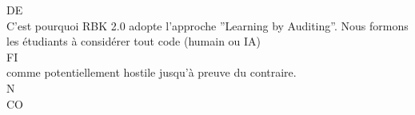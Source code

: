 \documentclass[12pt,landscape,a4paper]{article}
\begin{document}
\vspace{0.5em}
\vspace{0.5em}
\vspace{0.5em}
DE\\
C’est pourquoi RBK 2.0 adopte l’approche ”Learning by Auditing”. Nous formons les étudiants à considérer tout code (humain ou IA)\\
\vspace{0.5em}
\vspace{0.5em}
\vspace{0.5em}
\vspace{0.5em}
FI\\
comme potentiellement hostile jusqu’à preuve du contraire.\\
\vspace{0.5em}
\vspace{0.5em}
N\\
CO\\
\end{document}

